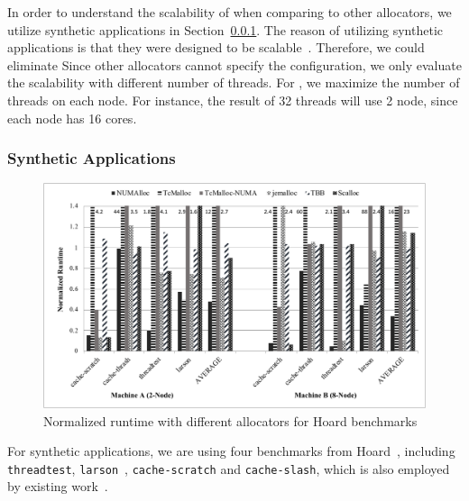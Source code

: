  In order to understand the scalability of \NM{} when comparing to other allocators, we utilize synthetic applications in Section~\ref{sec:synthetic}. The reason of utilizing synthetic applications is that they were designed to be scalable~\cite{Scalloc}. Therefore, we could eliminate Since other allocators cannot specify the configuration, we only evaluate the scalability with different number of threads. For \NM{}, we maximize the number of threads on each node. For instance, the result of 32 threads will use 2 node, since each node has 16 cores.  

\subsubsection{Synthetic Applications}
\label{sec:synthetic}

\begin{figure}[!ht]
    \centering
    \includegraphics[width=\textwidth]{figure/hoard-perf.pdf}
    \caption{Normalized runtime with different allocators for Hoard benchmarks}
    \label{hoard-perf}
\end{figure}

For synthetic applications, we are using four benchmarks from Hoard~\cite{Hoard}, including \texttt{threadtest}, \texttt{larson}~\cite{Larson}, \texttt{cache-scratch} and \texttt{cache-slash}, which is also employed by existing work~\cite{Scalloc}. 


